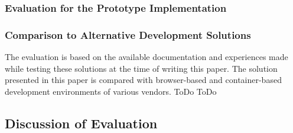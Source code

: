 \subsubsection{Evaluation for the Prototype Implementation}

\subsubsection{Comparison to Alternative Development Solutions}
The evaluation is based on the available documentation and experiences made while testing these solutions at the time of writing this paper. The solution presented in this paper is compared with browser-based and container-based development environments of various vendors.
ToDo
ToDo
\subsection{Discussion of Evaluation}


